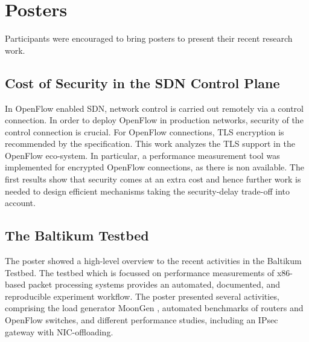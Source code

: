 \section{Posters}\label{sec:posters}

Participants were encouraged to bring posters to present
their recent research work.

\subsection{Cost of Security in the SDN Control Plane}

In OpenFlow enabled \ac{SDN}, network control is carried out remotely via a
control connection. In order to deploy OpenFlow in production networks,
security of the control connection is crucial. For OpenFlow connections, TLS
encryption is recommended by the specification. This work
\cite{wkellerer:conext:2015} analyzes the TLS support in the OpenFlow
eco-system. In particular, a performance measurement tool was implemented for
encrypted OpenFlow connections, as there is non available. The first results
show that security comes at an extra cost and hence further work is needed to
design efficient mechanisms taking the security-delay trade-off into account.


\subsection{The Baltikum Testbed}

The poster showed a high-level overview to the recent activities
\cite{pemmerich:imc:2015, sgallenmuller:ancs:2015, draumer:cloudnet:2016,
draumer:anrw:2016} in the Baltikum Testbed. The testbed which is focussed on
performance measurements of x86-based packet processing systems provides an
automated, documented, and reproducible experiment workflow. The poster
presented several activities, comprising the load generator MoonGen
\cite{pemmerich:imc:2015}, automated benchmarks of routers and OpenFlow
switches, and different performance studies, including an IPsec gateway with
NIC-offloading.

